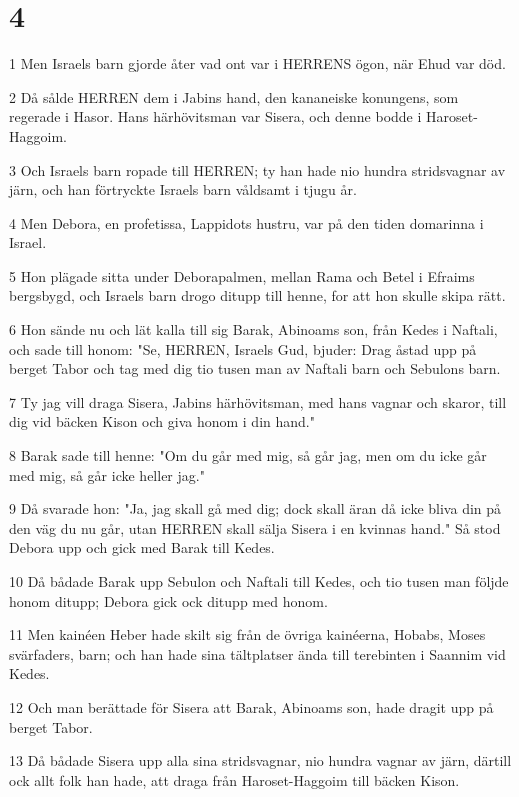 \chapter{4}

\par 1 Men Israels barn gjorde åter vad ont var i HERRENS ögon, när Ehud var död.
\par 2 Då sålde HERREN dem i Jabins hand, den kananeiske konungens, som regerade i Hasor. Hans härhövitsman var Sisera, och denne bodde i Haroset-Haggoim.
\par 3 Och Israels barn ropade till HERREN; ty han hade nio hundra stridsvagnar av järn, och han förtryckte Israels barn våldsamt i tjugu år.
\par 4 Men Debora, en profetissa, Lappidots hustru, var på den tiden domarinna i Israel.
\par 5 Hon plägade sitta under Deborapalmen, mellan Rama och Betel i Efraims bergsbygd, och Israels barn drogo ditupp till henne, for att hon skulle skipa rätt.
\par 6 Hon sände nu och lät kalla till sig Barak, Abinoams son, från Kedes i Naftali, och sade till honom: "Se, HERREN, Israels Gud, bjuder: Drag åstad upp på berget Tabor och tag med dig tio tusen man av Naftali barn och Sebulons barn.
\par 7 Ty jag vill draga Sisera, Jabins härhövitsman, med hans vagnar och skaror, till dig vid bäcken Kison och giva honom i din hand."
\par 8 Barak sade till henne: "Om du går med mig, så går jag, men om du icke går med mig, så går icke heller jag."
\par 9 Då svarade hon: "Ja, jag skall gå med dig; dock skall äran då icke bliva din på den väg du nu går, utan HERREN skall sälja Sisera i en kvinnas hand." Så stod Debora upp och gick med Barak till Kedes.
\par 10 Då bådade Barak upp Sebulon och Naftali till Kedes, och tio tusen man följde honom ditupp; Debora gick ock ditupp med honom.
\par 11 Men kainéen Heber hade skilt sig från de övriga kainéerna, Hobabs, Moses svärfaders, barn; och han hade sina tältplatser ända till terebinten i Saannim vid Kedes.
\par 12 Och man berättade för Sisera att Barak, Abinoams son, hade dragit upp på berget Tabor.
\par 13 Då bådade Sisera upp alla sina stridsvagnar, nio hundra vagnar av järn, därtill ock allt folk han hade, att draga från Haroset-Haggoim till bäcken Kison.
